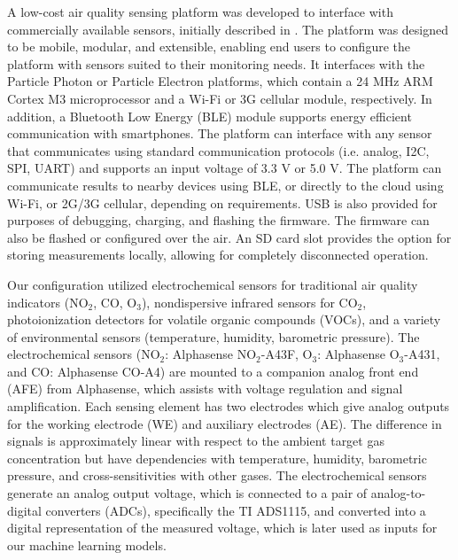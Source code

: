 \documentclass[journal abbreviation, manuscript]{copernicus}
\newcommand{\textus}[1]{$_{\text{#1}}$}
\begin{document}
A low-cost air quality sensing platform was developed to interface with commercially available sensors, initially described in \citet{Chan2017context}. The platform was designed to be mobile, modular, and extensible, enabling end users to configure the platform with sensors suited to their monitoring needs. It interfaces with the Particle Photon or Particle Electron platforms, which contain a 24 MHz ARM Cortex M3 microprocessor and a Wi-Fi or 3G cellular module, respectively. In addition, a Bluetooth Low Energy (BLE) module supports energy efficient communication with smartphones. The platform can interface with any sensor that communicates using standard communication protocols (i.e. analog, I2C, SPI, UART) and supports an input voltage of 3.3 V or 5.0 V. The platform can communicate results to nearby devices using BLE, or directly to the cloud using Wi-Fi, or 2G/3G cellular, depending on requirements.  USB is also provided for purposes of debugging, charging, and flashing the firmware.  The firmware can also be flashed or configured over the air. An SD card slot provides the option for storing measurements locally, allowing for completely disconnected operation.

Our configuration utilized electrochemical sensors for traditional air quality indicators (NO\textus{2}, CO, O\textus{3}), nondispersive infrared sensors for CO\textus{2}, photoionization detectors for volatile organic compounds (VOCs), and a variety of environmental sensors (temperature, humidity, barometric pressure). The electrochemical sensors (NO\textus{2}: Alphasense NO\textus{2}-A43F, O\textus{3}: Alphasense O\textus{3}-A431, and CO: Alphasense CO-A4) are mounted to a companion analog front end (AFE) from Alphasense, which assists with voltage regulation and signal amplification. Each sensing element has two electrodes which give analog outputs for the working electrode (WE) and auxiliary electrodes (AE). The difference in signals is approximately linear with respect to the ambient target gas concentration but have dependencies with temperature, humidity, barometric pressure, and cross-sensitivities with other gases. The electrochemical sensors generate an analog output voltage, which is connected to a pair of analog-to-digital converters (ADCs), specifically the TI ADS1115, and converted into a digital representation of the measured voltage, which is later used as inputs for our machine learning models.

\end{document}
